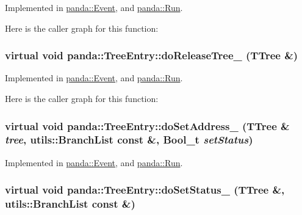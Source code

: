 Implemented in \hyperlink{classpanda_1_1Event_a7907201dc93916ed71696bc276793c80}{panda::Event}, and \hyperlink{classpanda_1_1Run_ab2308a77944053b5ad6939cb3e63041f}{panda::Run}.

Here is the caller graph for this function:\hypertarget{classpanda_1_1TreeEntry_a44e70436de0dc8088885895ea0011a2d}{
\subsubsection[{doReleaseTree\_\-}]{\setlength{\rightskip}{0pt plus 5cm}virtual void panda::TreeEntry::doReleaseTree\_\- (TTree \&)}}
\label{classpanda_1_1TreeEntry_a44e70436de0dc8088885895ea0011a2d}


Implemented in \hyperlink{classpanda_1_1Event_a63ef383a11be99bbf46771468557c89a}{panda::Event}, and \hyperlink{classpanda_1_1Run_a8a59dc2c95b3a5e3bc43040c119320cd}{panda::Run}.

Here is the caller graph for this function:\hypertarget{classpanda_1_1TreeEntry_abdb184144bf5a4ca8b0fdb6d06c5d4c1}{
\subsubsection[{doSetAddress\_\-}]{\setlength{\rightskip}{0pt plus 5cm}virtual void panda::TreeEntry::doSetAddress\_\- (TTree \& {\em tree}, \/  {\bf utils::BranchList} const \&, \/  Bool\_\-t {\em setStatus})}}
\label{classpanda_1_1TreeEntry_abdb184144bf5a4ca8b0fdb6d06c5d4c1}


Implemented in \hyperlink{classpanda_1_1Event_abe96424e8e74474e69a0f7bee8b6d38e}{panda::Event}, and \hyperlink{classpanda_1_1Run_a1fed64cabd5142e8b6981fdbadd9d2ae}{panda::Run}.\hypertarget{classpanda_1_1TreeEntry_a8c17222accba71d53b73ad6e2c3276a2}{
\subsubsection[{doSetStatus\_\-}]{\setlength{\rightskip}{0pt plus 5cm}virtual void panda::TreeEntry::doSetStatus\_\- (TTree \&, \/  {\bf utils::BranchList} const \&)}}
\label{classpanda_1_1TreeEntry_a8c17222accba71d53b73ad6e2c3276a2}


